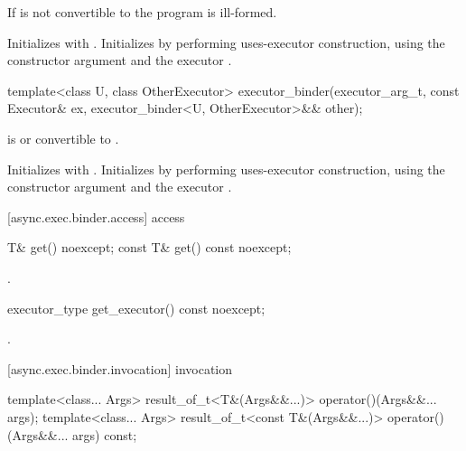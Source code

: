 \begin{itemdescr}
\pnum
\requires If  is not convertible to  the program is ill-formed.

\pnum
\effects Initializes  with . Initializes  by performing uses-executor construction, using the constructor argument  and the executor .
\end{itemdescr}

\begin{itemdecl}
template<class U, class OtherExecutor>
  executor_binder(executor_arg_t, const Executor& ex,
    executor_binder<U, OtherExecutor>&& other);
\end{itemdecl}

\begin{itemdescr}
\pnum
\requires {} is  or convertible to .

\pnum
\effects Initializes  with . Initializes  by performing uses-executor construction, using the constructor argument  and the executor .
\end{itemdescr}



[async.exec.binder.access]{ access}

\begin{itemdecl}
T& get() noexcept;
const T& get() const noexcept;
\end{itemdecl}

\begin{itemdescr}
\pnum
\returns {}.
\end{itemdescr}

\begin{itemdecl}
executor_type get_executor() const noexcept;
\end{itemdecl}

\begin{itemdescr}
\pnum
\returns {}.
\end{itemdescr}



[async.exec.binder.invocation]{ invocation}

\begin{itemdecl}
template<class... Args>
  result_of_t<T&(Args&&...)> operator()(Args&&... args);
template<class... Args>
  result_of_t<const T&(Args&&...)> operator()(Args&&... args) const;
\end{itemdecl}

